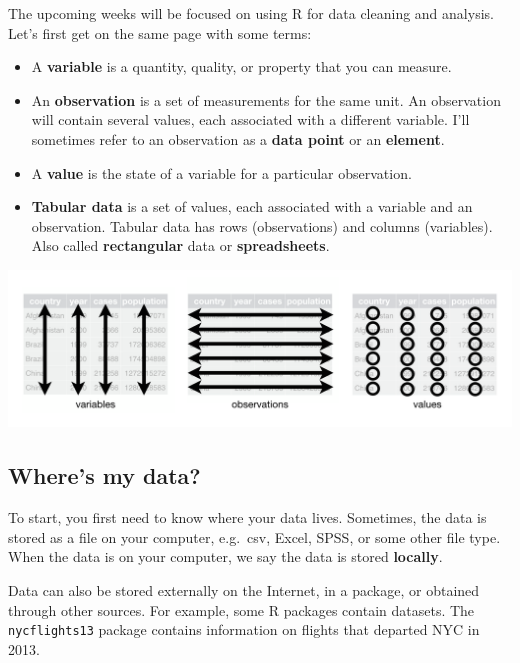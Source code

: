 \documentclass[]{book}
\begin{document}
The upcoming weeks will be focused on using R for data cleaning and analysis. Let's first get on the same page with some terms:

\begin{itemize}
\item
  A \textbf{variable} is a quantity, quality, or property that you can measure.
\item
  An \textbf{observation} is a set of measurements for the same unit. An observation will contain several values, each associated with a different variable. I'll sometimes refer to an observation as a \textbf{data point} or an \textbf{element}.
\item
  A \textbf{value} is the state of a variable for a particular observation.
\item
  \textbf{Tabular data} is a set of values, each associated with a variable and an observation. Tabular data has rows (observations) and columns (variables). Also called \textbf{rectangular} data or \textbf{spreadsheets}.
\end{itemize}

\includegraphics{img/tidy-1.png}

\hypertarget{wheres-my-data}{%
\subsection{Where's my data?}\label{wheres-my-data}}

To start, you first need to know where your data lives. Sometimes, the data is stored as a file on your computer, e.g.~csv, Excel, SPSS, or some other file type. When the data is on your computer, we say the data is stored \textbf{locally}.

Data can also be stored externally on the Internet, in a package, or obtained through other sources. For example, some R packages contain datasets. The \texttt{nycflights13} package contains information on flights that departed NYC in 2013.
\end{document}
